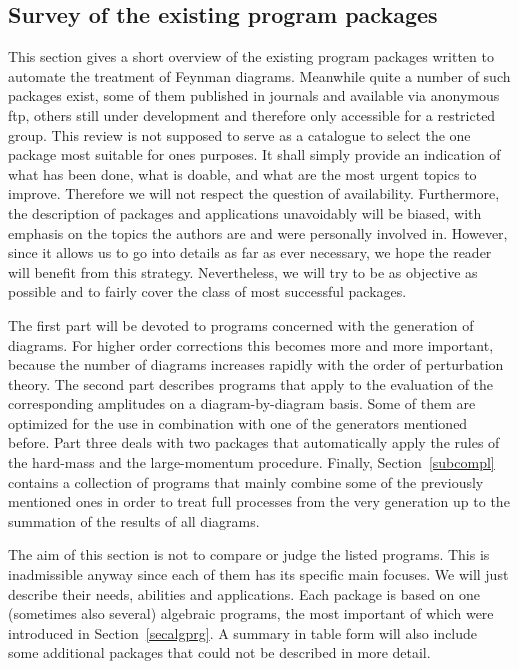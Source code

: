 %
\subsection{\label{subsurvey}Survey of the existing program packages}
%

This section gives a short overview of the existing program packages
written to automate the treatment of Feynman diagrams.  Meanwhile quite
a number of such packages exist, some of them published in journals and
available via anonymous ftp, others still under development and
therefore only accessible for a restricted group.  This review is not
supposed to serve as a catalogue to select the one package most suitable
for ones purposes. It shall simply provide an indication of what has
been done, what is doable, and what are the most urgent topics to
improve. Therefore we will not respect the question of availability.
Furthermore, the description of packages and applications unavoidably
will be biased, with emphasis on the topics the authors are and were
personally involved in.  However, since it allows us to go into details
as far as ever necessary, we hope the reader will benefit from this
strategy.  Nevertheless, we will try to be as objective as possible and
to fairly cover the class of most successful packages.

The first part will be devoted to programs concerned with the generation
of diagrams. For higher order corrections this becomes more and more
important, because the number of diagrams increases rapidly with the
order of perturbation theory.  The second part describes programs that
apply to the evaluation of the corresponding amplitudes on a
diagram-by-diagram basis. Some of them are optimized for the use in
combination with one of the generators mentioned before.  Part three
deals with two packages that automatically apply the rules of the
hard-mass and the large-momentum procedure.  Finally,
Section~\ref{subcompl} contains a collection of programs that mainly
combine some of the previously mentioned ones in order to treat full
processes from the very generation up to the summation of the results of
all diagrams.

The aim of this section is not to compare or judge the listed programs.
This is inadmissible anyway since each of them has its specific main
focuses.  We will just describe their needs, abilities and applications.
Each package is based on one (sometimes also several) algebraic
programs, the most important of which were introduced in
Section~\ref{secalgprg}.  A summary in table form will also include some
additional packages that could not be described in more detail.

